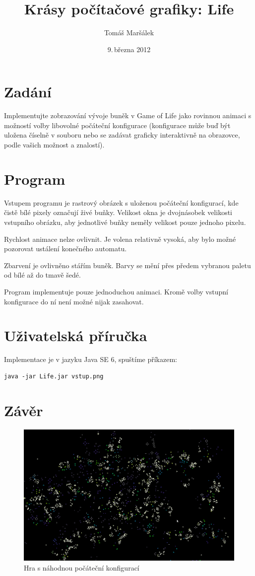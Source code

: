 \documentclass[11pt]{article}
\title{Krásy počítačové grafiky: Life}
\author{Tomáš Maršálek}
\date{9.\,března 2012}
\begin{document}
\maketitle

\section{Zadání}
Implementujte zobrazování vývoje buněk v Game of Life jako rovinnou animaci s
možností volby libovolné počáteční konfigurace (konfigurace může buď být
uložena číselně v souboru nebo se zadávat graficky interaktivně na obrazovce,
podle vašich možnost a znalostí).

\section{Program}
Vstupem programu je rastrový obrázek s uloženou počáteční konfigurací, kde
čistě bílé pixely označují živé buňky. Velikost okna je dvojnásobek velikosti
vstupního obrázku, aby jednotlivé buňky neměly velikost pouze jednoho pixelu.

Rychlost animace nelze ovlivnit. Je volena relativně vysoká, aby bylo možné
pozorovat ustálení konečného automatu.

Zbarvení je ovlivněno stářím buněk. Barvy se mění přes předem vybranou paletu
od bílé až do tmavě šedé.

Program implementuje pouze jednoduchou animaci. Kromě volby vstupní konfigurace
do ní není možné nijak zasahovat.

\section{Uživatelská příručka}
Implementace je v jazyku Java SE 6, spuštíme příkazem:

\begin{verbatim}
java -jar Life.jar vstup.png
\end{verbatim}

\section{Závěr}

\begin{figure}[ht!]
\centering
	\includegraphics[width=18cm,angle=270]{life.png}
	\caption{Hra s náhodnou počáteční konfigurací}
\end{figure}
\end{document}
